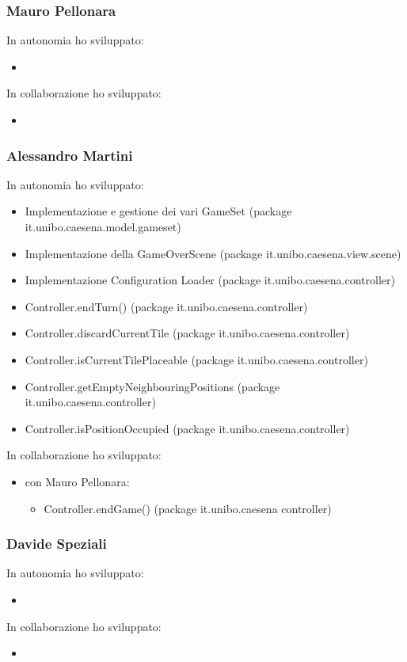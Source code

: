 \subsubsection*{Mauro Pellonara} 
In autonomia ho sviluppato:
\begin{itemize}
    \item 
\end{itemize}
In collaborazione ho sviluppato:
\begin{itemize}
    \item 
\end{itemize}

\subsubsection*{Alessandro Martini}
In autonomia ho sviluppato:
\begin{itemize}
    \item Implementazione e gestione dei vari GameSet (package it.unibo.caesena.model.gameset)
    \item Implementazione della GameOverScene (package it.unibo.caesena.view.scene)
    \item Implementazione Configuration Loader (package it.unibo.caesena.controller) 
    \item Controller.endTurn() (package it.unibo.caesena.controller)
    \item Controller.discardCurrentTile (package it.unibo.caesena.controller)
    \item Controller.isCurrentTilePlaceable (package it.unibo.caesena.controller)
    \item Controller.getEmptyNeighbouringPositions (package it.unibo.caesena.controller)
    \item Controller.isPositionOccupied (package it.unibo.caesena.controller)
\end{itemize}
In collaborazione ho sviluppato:
\begin{itemize}
    \item con Mauro Pellonara: 
    \begin{itemize}
        \item Controller.endGame() (package it.unibo.caesena controller)
    \end{itemize}
\end{itemize}

\subsubsection*{Davide Speziali}
In autonomia ho sviluppato:
\begin{itemize}
    \item 
\end{itemize}
In collaborazione ho sviluppato:
\begin{itemize}
    \item 
\end{itemize}

